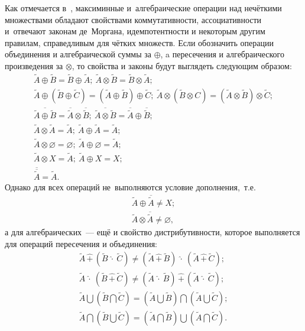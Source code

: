 Как отмечается в~\cite{Rutkovskaya, Kaufmann}, максиминные и~алгебраические операции над нечёткими множествами обладают свойствами коммутативности, ассоциативности и~отвечают законам де~Моргана, идемпотентности и некоторым другим правилам, справедливым для чётких множеств. Если обозначить операции объединения и алгебраической суммы за $\oplus$, a пересечения и алгебраического произведения за $\otimes$, то свойства и законы будут выглядеть следующим образом:
\begin{gather*}
	\tilde A \oplus \tilde B = \tilde B \oplus \tilde A;\ \tilde A \otimes \tilde B = \tilde B \otimes \tilde A; \\
	\tilde A \oplus \left(\tilde B \oplus \tilde C \right) = \left( \tilde A \oplus \tilde B \right) \oplus \tilde C;\ \tilde A \otimes \left(\tilde B \otimes C \right) = \left( \tilde A \otimes \tilde B \right) \otimes \tilde C;\\
	\overline{\tilde A \oplus \tilde B}=\overline{\tilde A} \otimes \overline{\tilde B};\  \overline{\tilde A \otimes \tilde B}=\overline{\tilde A} \oplus \overline{\tilde B}; \\
	\tilde A \otimes \tilde A = \tilde A;\ \tilde A \oplus \tilde A = \tilde A; \\
	\tilde A \otimes \varnothing = \varnothing;\ \tilde A \oplus \varnothing = \tilde A; \\
	\tilde A \otimes X = \tilde A;\ \tilde A \oplus X = X; \\
	\overline{\overline{\tilde A}} = \tilde A.
\end{gather*}
Однако для всех операций не~выполняются условие дополнения,~т.е.
\begin{gather*}
	\tilde{A} \oplus \overline{\tilde{A}}\ne X; \\
	\tilde{A} \otimes \overline{\tilde{A}}\ne \varnothing,
\end{gather*}
а для алгебраических~--- ещё и свойство дистрибутивности, которое выполняется для операций пересечения и объединения:
\begin{gather*}
	\tilde{A}\, \widehat{+}\, \left( \tilde{B}\ \widehat{\cdot}\ \tilde C \right) \neq \left( \tilde A\, \widehat{+}\, \tilde B \right)\ \widehat{\cdot}\ \left(\tilde A\, \widehat{+}\, \tilde C \right); \\
		\tilde{A}\ \widehat{\cdot}\ \left( \tilde{B}\, \widehat{+}\, \tilde C \right) \neq \left( \tilde A\ \widehat{\cdot}\ \tilde B \right)\, \widehat{+}\, \left(\tilde A\ \widehat{\cdot}\ \tilde C \right); \\
	\tilde A \bigcup \left( \tilde B \bigcap \tilde C \right) = \left(\tilde A \bigcup \tilde B \right) \bigcap \left(\tilde A \bigcup \tilde C \right); \\
	\tilde A \bigcap \left( \tilde B \bigcup \tilde C \right) = \left(\tilde A \bigcap \tilde B \right) \bigcup \left(\tilde A \bigcap \tilde C \right).
\end{gather*}

